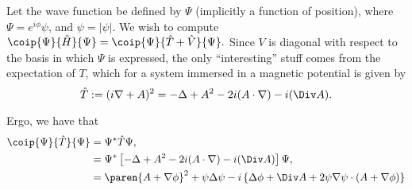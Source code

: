 \documentclass[onecolumn,,amsmath,amssymb,nofootinbib,floatfix]{revtex4}
\begin{document}
Let the wave function be defined by $\Psi$ (implicitly a function of position), where $\Psi=e^{i\phi} \psi$, and $\psi=|\psi|$.  We wish to compute $\coip{\Psi}{\hat H}{\Psi} = \coip{\Psi}{\hat T+\hat V}{\Psi}.$  Since $V$ is diagonal with respect to the basis in which $\Psi$ is expressed, the only ``interesting'' stuff comes from the expectation of $T$, which for a system immersed in a magnetic potential is given by $$\hat T:=(i\nabla + A)^2 = -\Delta + A^2 - 2i(A\cdot \nabla) - i(\Div A).$$

Ergo, we have that
$$
\begin{aligned}
\coip{\Psi}{\hat T}{\Psi}
&= \Psi^* \hat T \Psi, \\
&= \Psi^* \left[-\Delta + A^2 - 2i(A\cdot \nabla) - i(\Div A)\right] \Psi, \\
&= \paren{A+\nabla \phi}^2 + \psi\Delta \psi - i\left\{\Delta \phi + \Div A + 2\psi\nabla\psi \cdot (A+\nabla\phi)\right\}
\end{aligned}
$$
\end{document}
